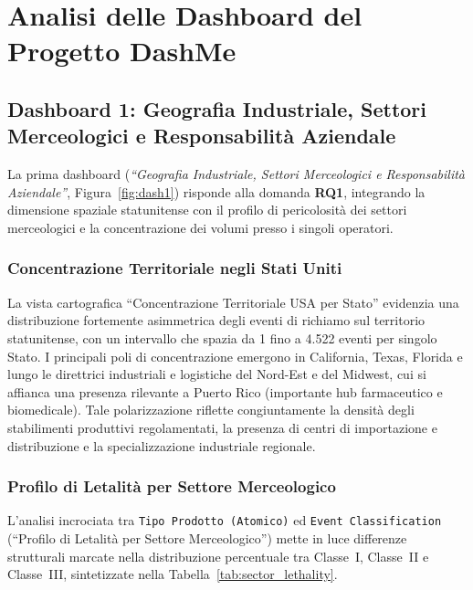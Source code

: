 \chapter{Analisi delle Dashboard del Progetto DashMe}
\label{sec:dashboard_analysis}

\section{Dashboard 1: Geografia Industriale, Settori Merceologici e Responsabilità Aziendale}
\label{subsec:dash1}

La prima dashboard (\textit{``Geografia Industriale, Settori Merceologici e Responsabilità Aziendale''}, Figura~\ref{fig:dash1}) risponde alla domanda \textbf{RQ1}, integrando la dimensione spaziale statunitense con il profilo di pericolosità dei settori merceologici e la concentrazione dei volumi presso i singoli operatori.


\subsection{Concentrazione Territoriale negli Stati Uniti}
La vista cartografica ``Concentrazione Territoriale USA per Stato'' evidenzia una distribuzione fortemente asimmetrica degli eventi di richiamo sul territorio statunitense, con un intervallo che spazia da 1 fino a 4.522 eventi per singolo Stato. I principali poli di concentrazione emergono in California, Texas, Florida e lungo le direttrici industriali e logistiche del Nord-Est e del Midwest, cui si affianca una presenza rilevante a Puerto Rico (importante hub farmaceutico e biomedicale). Tale polarizzazione riflette congiuntamente la densità degli stabilimenti produttivi regolamentati, la presenza di centri di importazione e distribuzione e la specializzazione industriale regionale. 

\subsection{Profilo di Letalità per Settore Merceologico}
L'analisi incrociata tra \texttt{Tipo Prodotto (Atomico)} ed \texttt{Event Classification} (``Profilo di Letalità per Settore Merceologico'') mette in luce differenze strutturali marcate nella distribuzione percentuale tra Classe~I, Classe~II e Classe~III, sintetizzate nella Tabella~\ref{tab:sector_lethality}.

